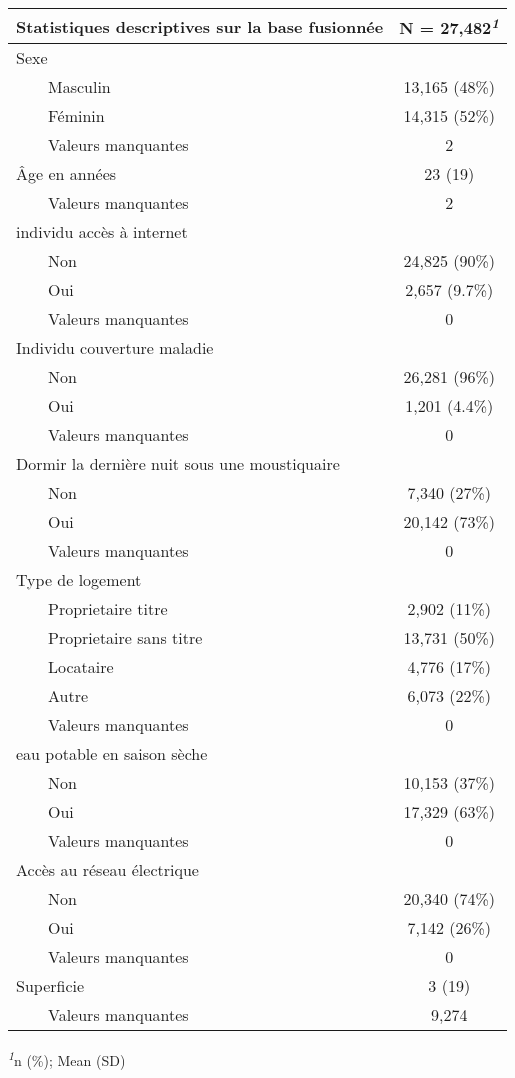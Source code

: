 \documentclass[
]{article}
\begin{document}
\begin{table}[!t]
\fontsize{12.0pt}{14.4pt}\selectfont
\begin{tabular*}{\linewidth}{@{\extracolsep{\fill}}lc}
\toprule
Statistiques descriptives sur la base fusionnée & \textbf{N = 27,482}\textsuperscript{\textit{1}} \\ 
\midrule\addlinespace[2.5pt]
Sexe &  \\ 
    Masculin & 13,165 (48\%) \\ 
    Féminin & 14,315 (52\%) \\ 
    Valeurs manquantes & 2 \\ 
Âge en années & 23 (19) \\ 
    Valeurs manquantes & 2 \\ 
individu accès à internet &  \\ 
    Non & 24,825 (90\%) \\ 
    Oui & 2,657 (9.7\%) \\ 
    Valeurs manquantes & 0 \\ 
Individu couverture maladie &  \\ 
    Non & 26,281 (96\%) \\ 
    Oui & 1,201 (4.4\%) \\ 
    Valeurs manquantes & 0 \\ 
Dormir la dernière nuit sous une moustiquaire &  \\ 
    Non & 7,340 (27\%) \\ 
    Oui & 20,142 (73\%) \\ 
    Valeurs manquantes & 0 \\ 
Type de logement &  \\ 
    Proprietaire titre & 2,902 (11\%) \\ 
    Proprietaire sans titre & 13,731 (50\%) \\ 
    Locataire & 4,776 (17\%) \\ 
    Autre & 6,073 (22\%) \\ 
    Valeurs manquantes & 0 \\ 
eau potable en saison sèche &  \\ 
    Non & 10,153 (37\%) \\ 
    Oui & 17,329 (63\%) \\ 
    Valeurs manquantes & 0 \\ 
Accès au réseau électrique &  \\ 
    Non & 20,340 (74\%) \\ 
    Oui & 7,142 (26\%) \\ 
    Valeurs manquantes & 0 \\ 
Superficie & 3 (19) \\ 
    Valeurs manquantes & 9,274 \\ 
\bottomrule
\end{tabular*}
\begin{minipage}{\linewidth}
\textsuperscript{\textit{1}}n (\%); Mean (SD)\\
\end{minipage}
\end{table}
\end{document}
